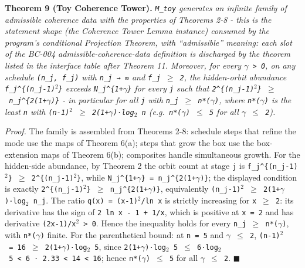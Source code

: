 \documentclass[
  american,
  11pt,
  letterpaper,
]{article}
\begin{document}
\textbf{Theorem 9 (Toy Coherence Tower).} \emph{\texttt{M\_toy} generates an infinite family of admissible coherence data with the properties of Theorems 2-8 - this is the statement shape (the Coherence Tower Lemma instance) consumed by the program's conditional Projection Theorem, with ``admissible'' meaning: each slot of the BC-004 admissible-coherence-data definition is discharged by the theorem listed in the interface table after Theorem 11. Moreover, for every \texttt{\ensuremath{\gamma}\ \textgreater{}\ 0}, on any schedule \texttt{(n\_j,\ f\_j)} with \texttt{n\_j\ →\ ∞} and \texttt{f\_j\ \ensuremath{\geq}\ 2}, the hidden-orbit abundance \texttt{f\_j\^{}\{(n\_j-1)\ensuremath{{}^{2}}\}} exceeds \texttt{N\_j\^{}\{1+\ensuremath{\gamma}\}} for every \texttt{j} such that \texttt{2\^{}\{(n\_j-1)\ensuremath{{}^{2}}\}\ \ensuremath{\geq}\ n\_j\^{}\{2(1+\ensuremath{\gamma})\}} - in particular for all \texttt{j} with \texttt{n\_j\ \ensuremath{\geq}\ n*(\ensuremath{\gamma})}, where \texttt{n*(\ensuremath{\gamma})} is the least \texttt{n} with \texttt{(n-1)\ensuremath{{}^{2}}\ \ensuremath{\geq}\ 2(1+\ensuremath{\gamma})·log\ensuremath{{}_{2}}\ n} (e.g.~\texttt{n*(\ensuremath{\gamma})\ \ensuremath{\leq}\ 5} for all \texttt{\ensuremath{\gamma}\ \ensuremath{\leq}\ 2}).}

\emph{Proof.} The family is assembled from Theorems 2-8: schedule steps that refine the mode use the maps of Theorem 6(a); steps that grow the box use the box-extension maps of Theorem 6(b); composites handle simultaneous growth. For the hidden-side abundance, by Theorem 2 the orbit count at stage \texttt{j} is \texttt{f\_j\^{}\{(n\_j-1)\ensuremath{{}^{2}}\}\ \ensuremath{\geq}\ 2\^{}\{(n\_j-1)\ensuremath{{}^{2}}\}}, while \texttt{N\_j\^{}\{1+\ensuremath{\gamma}\}\ =\ n\_j\^{}\{2(1+\ensuremath{\gamma})\}}; the displayed condition is exactly \texttt{2\^{}\{(n\_j-1)\ensuremath{{}^{2}}\}\ \ensuremath{\geq}\ n\_j\^{}\{2(1+\ensuremath{\gamma})\}}, equivalently \texttt{(n\_j-1)\ensuremath{{}^{2}}\ \ensuremath{\geq}\ 2(1+\ensuremath{\gamma})·log\ensuremath{{}_{2}}\ n\_j}. The ratio \texttt{q(x)\ =\ (x-1)\ensuremath{{}^{2}}/ln\ x} is strictly increasing for \texttt{x\ \ensuremath{\geq}\ 2}: its derivative has the sign of \texttt{2\ ln\ x\ -\ 1\ +\ 1/x}, which is positive at \texttt{x\ =\ 2} and has derivative \texttt{(2x-1)/x\ensuremath{{}^{2}}\ \textgreater{}\ 0}. Hence the inequality holds for every \texttt{n\_j\ \ensuremath{\geq}\ n*(\ensuremath{\gamma})}, with \texttt{n*(\ensuremath{\gamma})} finite. For the parenthetical bound: at \texttt{n\ =\ 5} and \texttt{\ensuremath{\gamma}\ \ensuremath{\leq}\ 2}, \texttt{(n-1)\ensuremath{{}^{2}}\ =\ 16\ \ensuremath{\geq}\ 2(1+\ensuremath{\gamma})·log\ensuremath{{}_{2}}\ 5}, since \texttt{2(1+\ensuremath{\gamma})·log\ensuremath{{}_{2}}\ 5\ \ensuremath{\leq}\ 6·log\ensuremath{{}_{2}}\ 5\ \textless{}\ 6\ ·\ 2.33\ \textless{}\ 14\ \textless{}\ 16}; hence \texttt{n*(\ensuremath{\gamma})\ \ensuremath{\leq}\ 5} for all \texttt{\ensuremath{\gamma}\ \ensuremath{\leq}\ 2}. \ensuremath{\blacksquare}
\end{document}
